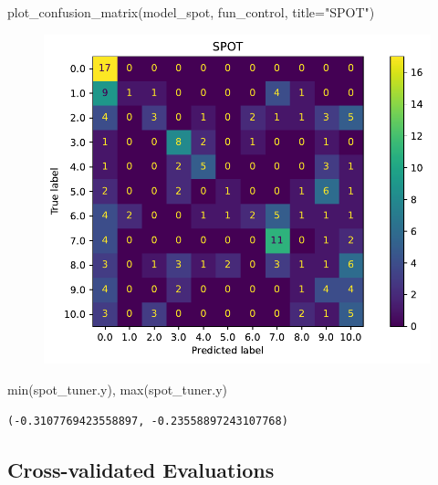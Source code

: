 \documentclass[
  letterpaper,
  DIV=11,
  numbers=noendperiod]{scrreprt}
\newenvironment{Shaded}{\begin{snugshade}}{\end{snugshade}}
\newcommand{\BuiltInTok}[1]{\textcolor[rgb]{0.00,0.23,0.31}{#1}}
\newcommand{\NormalTok}[1]{\textcolor[rgb]{0.00,0.23,0.31}{#1}}
\newcommand{\OperatorTok}[1]{\textcolor[rgb]{0.37,0.37,0.37}{#1}}
\newcommand{\StringTok}[1]{\textcolor[rgb]{0.13,0.47,0.30}{#1}}
\begin{document}
\begin{Shaded}
\begin{Highlighting}[]
\NormalTok{plot\_confusion\_matrix(model\_spot, fun\_control, title}\OperatorTok{=}\StringTok{"SPOT"}\NormalTok{)}
\end{Highlighting}
\end{Shaded}

\begin{figure}[H]

{\centering \includegraphics{19_spot_hpt_sklearn_multiclass_classification_knn_files/figure-pdf/cell-41-output-1.pdf}

}

\end{figure}

\begin{Shaded}
\begin{Highlighting}[]
\BuiltInTok{min}\NormalTok{(spot\_tuner.y), }\BuiltInTok{max}\NormalTok{(spot\_tuner.y)}
\end{Highlighting}
\end{Shaded}

\begin{verbatim}
(-0.3107769423558897, -0.23558897243107768)
\end{verbatim}

\hypertarget{cross-validated-evaluations-3}{%
\subsection{Cross-validated
Evaluations}\label{cross-validated-evaluations-3}}
\end{document}
